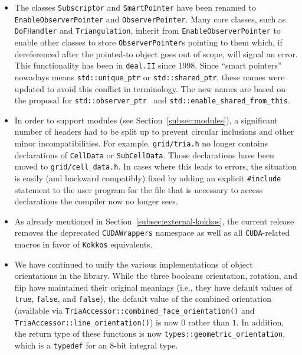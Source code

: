 \documentclass{ansarticle-preprint}
\newcommand{\specialword}[1]{\texttt{#1}}
\newcommand{\dealii}{{\specialword{deal.II}}\xspace}
\newcommand{\kokkos}{{\specialword{Kokkos}}\xspace}
\begin{document}
\begin{itemize}
  \item The classes \texttt{Subscriptor} and \texttt{SmartPointer} have been
    renamed to \texttt{EnableObserverPointer} and \texttt{ObserverPointer}. Many
    core classes, such as \texttt{DoFHandler} and \texttt{Triangulation},
    inherit from \texttt{EnableObserverPointer} to enable other classes to store
    \texttt{ObserverPointer}s pointing to them which, if dereferenced after the
    pointed-to object goes out of scope, will signal an error. This
    functionality has been in \dealii since 1998. Since ``smart pointers''
    nowadays means \texttt{std::unique\_ptr} or \texttt{std::shared\_ptr}, these
    names were updated to avoid this conflict in terminology. The new names are
    based on the proposal for \texttt{std::observer\_ptr}~\cite{Brown2014} and
    \texttt{std::enable\_shared\_from\_this}.

  \item In order to support modules (see Section~\ref{subsec:modules}), a
    significant number of headers had to be split up to prevent circular
    inclusions and other minor incompatibilities. For example,
    \texttt{grid/tria.h} no longer contains declarations of \texttt{CellData} or
    \texttt{SubCellData}. Those declarations have been moved to
    \texttt{grid/cell\_data.h}. In cases where this leads to errors,
    the situation is easily (and backward compatibly) fixed by adding an explicit
    \texttt{\#include} statement to the user program for the file that is necessary to
    access declarations the compiler now no longer sees.

  \item As already mentioned in
    Section~\ref{subsec:external-kokkos}, the current release
    removes the deprecated \texttt{CUDAWrappers} namespace as well
    as all \texttt{CUDA}-related macros in favor of \kokkos
    equivalents.

  \item We have continued to unify the various implementations of object
    orientations in the library. While the three booleans orientation, rotation,
    and flip have maintained their original meanings (i.e., they have default
    values of \texttt{true}, \texttt{false}, and \texttt{false}), the default
    value of the combined orientation (available via
    \texttt{TriaAccessor::combined\_face\_orientation()} and
    \texttt{TriaAccessor::line\_orientation()}) is now $0$ rather than $1$. In
    addition, the return type of these functions is now
    \texttt{types::geometric\_orientation}, which is a \texttt{typedef} for an
    8-bit integral type.


\end{itemize}
\end{document}
